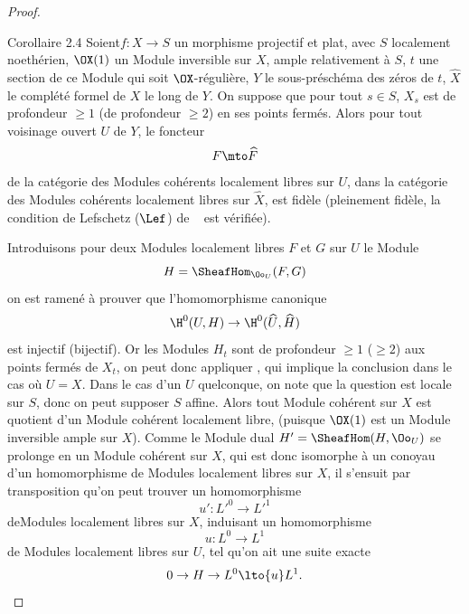 \begin{proof}
\label{XII.2.4}
\begin{enonce*}{Corollaire 2.4\ndemark}
Soient\pageoriginale $f:X\to S$ un morphisme projectif et plat, avec $S$ localement noeth\'erien, $\OX(1)$ un Module inversible sur $X$, ample relativement \`a $S$, $t$ une section de ce Module qui soit $\OX$-r\'eguli\`ere, $Y$ le sous-pr\'esch\'ema des z\'eros de $t$, $\widehat{X}$ le compl\'et\'e formel de $X$ le long de $Y$. On suppose que pour tout $s\in S$, $X_s$ est de profondeur $\geq 1$ (\resp de profondeur $\geq 2$) en ses points ferm\'es. Alors pour tout voisinage ouvert $U$ de $Y$, le foncteur
\[
F \mto \widehat{F}
\]
de la cat\'egorie des Modules coh\'erents localement libres sur $U$, dans la cat\'egorie des Modules coh\'erents localement libres sur $\widehat{X}$, est fid\`ele (\resp pleinement fid\`ele, \ie la condition de Lefschetz ($\Lef$) de ~ est v\'erifi\'ee).
\end{enonce*}
Introduisons pour deux Modules localement libres $F$ et $G$ sur $U$ le Module
\[
H=\SheafHom_{\Oo_U}(F, G)
\]
on est ramen\'e \`a prouver que l'homomorphisme canonique
\steco
\begin{equation} \label{eq:XII.15} {}\H^0(U, H) \to \H^0(\widehat{U}, \widehat{H})
\end{equation}
est injectif (\resp bijectif). Or les Modules $H_t$ sont de profondeur $\geq 1$ (\resp $\geq 2$) aux points ferm\'es de $X_t$, on peut donc appliquer , qui implique la conclusion  dans le cas o\`u $U=X$. Dans le cas d'un $U$ quelconque, on note que la question est locale sur $S$, donc on peut supposer $S$ affine. Alors tout Module coh\'erent sur $X$ est quotient d'un Module coh\'erent localement libre, (puisque $\OX(1)$ est un Module inversible  ample sur $X$). Comme le Module dual $H'=\SheafHom(H, \Oo_U)$ se prolonge en un Module coh\'erent sur $X$, qui est donc isomorphe \`a un conoyau d'un homomorphisme de Modules localement libres sur $X$, il s'ensuit par transposition qu'on peut trouver un homomorphisme
\[
u':{L'}^0 \to {L'}^1
\]
de\pageoriginale Modules localement libres sur $X$, induisant un homomorphisme
\[
u:L^0 \to L^1
\]
de Modules localement libres sur $U$, tel qu'on ait une suite exacte
\[
0\to H \to L^0 \lto{u} L^1.
\]
\end{proof}
